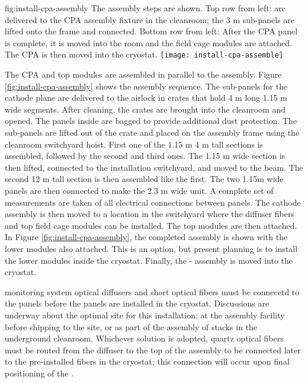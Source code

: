 \begin{dunefigure}{fig:install-cpa-assembly}
  {The  assembly steps are shown. Top row from left:   are delivered to the CPA assembly fixture in the cleanroom; the 3 \si{m} sub-panels are lifted onto the frame and connected. Bottom row from left: After the CPA panel is complete, it is moved into the room and the field cage modules are attached. The CPA is then moved into the cryostat.}
\texttt{[image: install-cpa-assemble]}
\end{dunefigure}

The CPA and top  modules are assembled in parallel to the  assembly. Figure \ref{fig:install-cpa-assembly} shows the  assembly sequence. The sub-panels for the cathode plane are delivered to the airlock in crates that hold 4 \si{m} long 1.15 \si{m} wide segments. After cleaning, the crates are brought into the cleanroom and opened. The panels inside are bagged to provide additional dust protection. The sub-panels are lifted out of the crate and placed on the assembly frame using the cleanroom switchyard hoist. First one of the 1.15 \si{m} 4 
\si{m} tall sections is assembled, followed by the second and third ones. The 1.15 \si{m} wide section is then lifted, connected to the installation switchyard, and moved to the  beam. The second 12 \si{m} tall section is then assembled like the first. The two 1.15m wide panels are then connected to make the 2.3 \si{m} wide unit.  A complete set of  measurements are taken of all electrical connections between panels.  The cathode assembly  is then moved to a location in the switchyard where the diffuser fibers and top field cage modules can be installed.
 The top  modules are then attached. In Figure \ref{fig:install-cpa-assembly}, the completed assembly is shown with the lower  modules also attached. This is an option, but present planning is to install the lower  modules  inside the cryostat. Finally, the - assembly is moved into the cryostat.


 monitoring system optical diffusers and short optical fibers must be connecetd to the  panels before the panels are installed in the cryostat.  Discussions are underway about the optimal site for this installation:  at the  assembly facility before shipping to the site, or as part of the assembly of  stacks in the underground cleanroom.  Whichever solution is adopted, quartz optical fibers must be routed from the diffuser to the top of the  assembly to be connected later to the pre-installed fibers in the cryostat; this connection will occur upon final positioning of the .  

